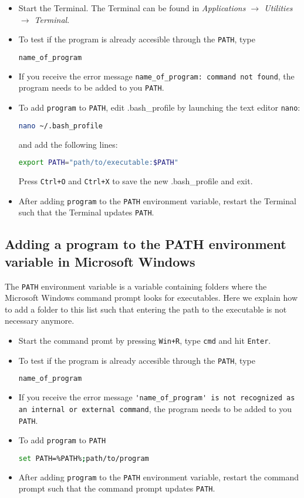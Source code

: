 \documentclass[a4paper,11pt]{article}
\begin{document}
\begin{itemize}
 \item Start the Terminal. The Terminal can be found in \textit{Applications $\rightarrow$ Utilities $\rightarrow$ Terminal}.
 \item To test if the program is already accesible through the \verb+PATH+, type
 \begin{lstlisting}[frame=single,language=bash]  
name_of_program
  \end{lstlisting}
  \item If you receive the error message \verb+name_of_program: command not found+, the program needs to be added to you \verb+PATH+.
  \item To add \verb+program+ to \verb+PATH+, edit .bash\_profile by launching the text editor \verb+nano+: 
\begin{lstlisting}[frame=single,language=bash]  
nano ~/.bash_profile
\end{lstlisting}
and add the following lines:
\begin{lstlisting}[frame=single,language=bash]  
export PATH="path/to/executable:$PATH"
\end{lstlisting}
Press \verb-Ctrl+O- and \verb-Ctrl+X- to save the new .bash\_profile and exit. 
\item After adding \verb+program+ to the \verb+PATH+ environment variable, restart the Terminal such that the Terminal updates \verb+PATH+. 
\end{itemize}

\subsection{Adding a program to the PATH environment variable in Microsoft Windows}
\label{sec:pathwin}
The \verb+PATH+ environment variable is a variable containing folders where the Microsoft Windows command prompt looks for executables. Here we explain how to add a folder to this list such that entering the path
to the executable is not necessary anymore. 

\begin{itemize}
 \item Start the command promt by pressing \verb#Win+R#, type  \verb+cmd+ and hit \verb+Enter+.
 \item To test if the program is already accesible through the \verb+PATH+, type
 \begin{lstlisting}[frame=single,language=bash]  
name_of_program
  \end{lstlisting}
  \item If you receive the error message \verb+'name_of_program' is not recognized as an internal or external command+, the program needs to be added to you \verb+PATH+.
  \item To add \verb+program+ to \verb+PATH+
  \begin{lstlisting}[frame=single,language=bash]  
set PATH=%PATH%;path/to/program
  \end{lstlisting}
 \item After adding \verb+program+ to the \verb+PATH+ environment variable, restart the command prompt such that the command prompt updates \verb+PATH+. 
\end{itemize}
\end{document}
